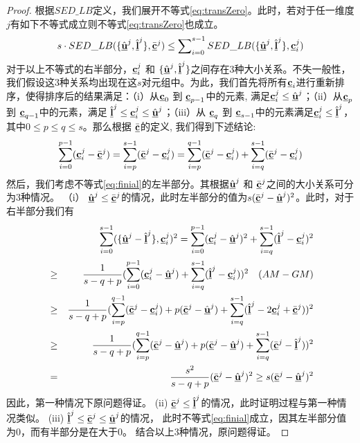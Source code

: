 \begin{proof}
	根据$SED\_LB$定义，我们展开不等式\ref{eq:transZero}。此时，若对于任一维度$j$有如下不等式成立则不等式\ref{eq:transZero}也成立。
	\begin{eqnarray}\label{eq:finial}
	s\cdot SED\_LB(\{\hat{\vu}^{j},\hat{\vl}^{j} \},\bar{\vc}^{j}) \le \sum\nolimits_{i=0}^{s-1}SED\_LB(\{\hat{\vu}^{j},\hat{\vl}^{j} \},{\vc}_{i}^{j})
	\end{eqnarray}
	对于以上不等式的右半部分，${\vc}_{i}^{j}$ 和 $\{\hat{\vu}^{j},\hat{\vl}^{j}\}$之间存在3种大小关系。不失一般性，我们假设这3种关系均出现在这$s$对元组中。为此，我们首先将所有$\vc_{i}$进行重新排序，使得排序后的结果满足：（i）从${\vc}_{0}$ 到 ${\vc}_{p-1}$中的元素, 满足${\vc}_{i}^{j} \le \hat{\vu}^{j}$；（ii）从${\vc}_{p}$ 到 ${\vc}_{q-1}$中的元素，满足 $\hat{\vl}^{j} \le {\vc}_{i}^{j} \le \hat{\vu}^{j}$；（iii）从 ${\vc}_{q}$ 到 ${\vc}_{s-1}$中的元素满足${\vc}_{i}^{j} \le \hat{\vl}^{j}$，其中$0\le p \le q \le s$。那么根据  $\bar{\vc}$的定义, 我们得到下述结论:
	\begin{eqnarray}\label{eq:mean}
	\sum_{i=0}^{p-1}(\vc_{i}^{j}- \bar{\vc}^{j})=\sum_{i=p}^{s-1}(\bar{\vc}^{j}- \vc_{i}^{j})=
	\sum_{i=p}^{q-1}(\bar{\vc}^{j}- \vc_{i}^{j}) +
	\sum_{i=q}^{s-1}(\bar{\vc}^{j}- \vc_{i}^{j})
	\end{eqnarray}
	然后，我们考虑不等式\ref{eq:finial}的左半部分。其根据$\hat{\vu}^{j}$ 和 $\bar{\vc}^{j}$之间的大小关系可分为3种情况。
	（i） $\hat{\vu}^{j} \le \bar{\vc}^{j}$的情况，此时左半部分的值为$s  (\bar{\vc}^{j}-\hat{\vu}^{j})^2$。此时，对于右半部分我们有
	\allowdisplaybreaks
	\begin{eqnarray}\label{eq:prove5R}
	&&\sum_{i=0}^{s-1}(\{ \hat{\vu}^{j} - \hat{\vl}^{j} \}, \vc_{i}^{j})^2 =
	\sum_{i=0}^{p-1}(\vc_{i}^{j} - \hat{\vu}^{j})^2 + \sum_{i=q}^{s-1}(\hat{\vl}^{j} - \vc_{i}^{j})^2 \nonumber \\
	&\ge& \frac{1}{s-q+p} (\sum_{i=0}^{p-1}(\vc_{i}^{j} - \hat{\vu}^{j}) + \sum_{i=q}^{s-1}(\hat{\vl}^{j}- \vc_{i}^{j}))^2  \quad (AM-GM) \nonumber \\
	&\ge& \frac{1}{s-q+p} (\sum_{i=p}^{q-1}(\bar{\vc}^{j}- \vc_{i}^{j}) + p (\bar{\vc}^{j}-\hat{\vu}^{j})+  \sum_{i=q}^{s-1}(\hat{\vl}^{j}- 2 \vc_{i}^{j} + \bar{\vc}^{j}))^2  \nonumber \\
	&\ge&\frac{1}{s-q+p}  (\sum_{i=p}^{q-1}(\bar{\vc}^{j}- \hat{\vu}^{j})  + p (\bar{\vc}^{j}-\hat{\vu}^{j}) + \sum_{i=q}^{s-1}(\bar{\vc}^{j}-\hat{\vl}^{j}) )^2 \nonumber \\
	&=&\frac{s^{2}}{s-q+p} (\bar{\vc}^{j}-\hat{\vu}^{j})^2 \ge s  (\bar{\vc}^{j}-\hat{\vu}^{j})^2
	\end{eqnarray}
	\allowdisplaybreaks[4]
	因此，第一种情况下原问题得证。
	(ii) $\bar{\vc}^{j} \le \hat{\vl}^{j}$的情况，此时证明过程与第一种情况类似。
	(iii) $\hat{\vl}^{j} \le \bar{\vc}^{j} \le \hat{\vu}^{j}$的情况， 此时不等式\ref{eq:finial}成立，因其左半部分值为0，而有半部分是在大于0。
	结合以上3种情况，原问题得证。
\end{proof}



